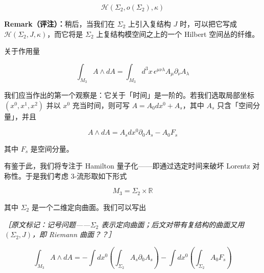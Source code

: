 \begin{equation}
  \mathcal{H}(\Sigma_2,o(\Sigma_2),\kappa)
  \tag{2.65}
  \label{eq:2.65}
\end{equation}

\textbf{Remark（评注）：}稍后，当我们在 $\Sigma_2$ 上引入复结构 $J$ 时，可以把它写成 $\mathcal{H}(\Sigma_2,J,\kappa)$，而它将是 $\Sigma_2$ 上复结构模空间之上的一个 Hilbert 空间丛的纤维。

关于作用量

\begin{equation}
  \int_{M_3}A\wedge dA=\int_{M_3}d^{3}x\,\epsilon^{\mu\nu\lambda}A_{\mu}\partial_{\nu}A_{\lambda}
  \tag{2.66}
  \label{eq:2.66}
\end{equation}

我们应当作出的第一个观察是：它关于「时间」是一阶的。若我们选取局部坐标 $(x^{0},x^{1},x^{2})$ 并以 $x^{0}$ 充当时间，则可写 $A=A_0dx^{0}+A_s$，其中 $A_s$ 只含「空间分量」，并且

\begin{equation}
  A\wedge dA=A_sdx^{0}\partial_0A_s-A_0F_s
  \tag{2.67}
  \label{eq:2.67}
\end{equation}

其中 $F_s$ 是空间分量。

有鉴于此，我们将专注于 Hamilton 量子化——即通过选定时间来破坏 Lorentz 对称性。于是我们考虑 3-流形取如下形式

\begin{equation}
  M_3=\Sigma_2\times\mathbb{R}
  \tag{2.68}
  \label{eq:2.68}
\end{equation}

其中 $\Sigma_2$ 是一个二维定向曲面。我们可以写出

{\small\itshape ［原文标记：记号问题——$\Sigma_2$ 表示定向曲面；后文对带有复结构的曲面又用 $(\Sigma_2,J)$，即 Riemann 曲面？？］}%

\begin{equation}
  \int_{M_3}A\wedge dA=-\int dx^{0}\left(\int_{\Sigma_2}A_s\partial_0A_s\right)-\int dx^{0}\left(\int_{\Sigma_2}A_0F_s\right)
  \tag{2.69}
  \label{eq:2.69}
\end{equation}



